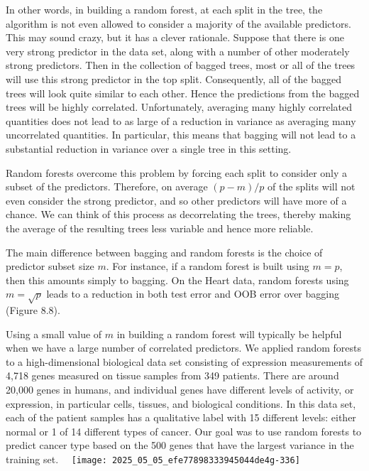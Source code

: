 \documentclass[10pt]{article}
\begin{document}
In other words, in building a random forest, at each split in the tree, the algorithm is not even allowed to consider a majority of the available predictors. This may sound crazy, but it has a clever rationale. Suppose that there is one very strong predictor in the data set, along with a number of other moderately strong predictors. Then in the collection of bagged trees, most or all of the trees will use this strong predictor in the top split. Consequently, all of the bagged trees will look quite similar to each other. Hence the predictions from the bagged trees will be highly correlated. Unfortunately, averaging many highly correlated quantities does not lead to as large of a reduction in variance as averaging many uncorrelated quantities. In particular, this means that bagging will not lead to a substantial reduction in variance over a single tree in this setting.

Random forests overcome this problem by forcing each split to consider only a subset of the predictors. Therefore, on average $(p-m) / p$ of the splits will not even consider the strong predictor, and so other predictors will have more of a chance. We can think of this process as decorrelating the trees, thereby making the average of the resulting trees less variable and hence more reliable.

The main difference between bagging and random forests is the choice of predictor subset size $m$. For instance, if a random forest is built using $m=p$, then this amounts simply to bagging. On the Heart data, random forests using $m=\sqrt{p}$ leads to a reduction in both test error and OOB error over bagging (Figure 8.8).

Using a small value of $m$ in building a random forest will typically be helpful when we have a large number of correlated predictors. We applied random forests to a high-dimensional biological data set consisting of expression measurements of 4,718 genes measured on tissue samples from 349 patients. There are around 20,000 genes in humans, and individual genes have different levels of activity, or expression, in particular cells, tissues, and biological conditions. In this data set, each of the patient samples has a qualitative label with 15 different levels: either normal or 1 of 14 different types of cancer. Our goal was to use random forests to predict cancer type based on the 500 genes that have the largest variance in the training set.\
\
\texttt{[image: 2025\_05\_05\_efe77898333945044de4g-336]}
\end{document}
